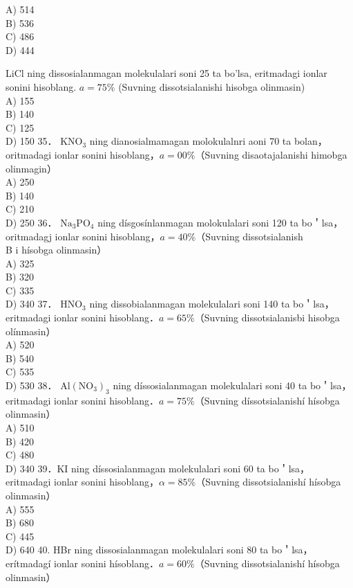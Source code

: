 A) 514\\
B) 536\\
C) 486\\
D) 444
  \item LiCl ning dissosialanmagan molekulalari soni 25 ta bo'lsa, eritmadagi ionlar sonini hisoblang. $a=75 \%$ (Suvning dissotsialanishi hisobga olinmasin)\\
A) 155\\
B) 140\\
C) 125\\
D) 150
35． $\mathrm{KNO}_{3}$ ning dianosialmamagan molokulalnri aoni 70 ta bolan，oritmadagi ionlar sonini hisoblang，$a=00 \%$（Suvning disaotajalanishi himobga olinmagin）\\
A) 250\\
B) 140\\
C) 210\\
D) 250
36． $\mathrm{Na}_{3} \mathrm{PO}_{4}$ ning dísgosínlanmagan molokulalari soni 120 ta bo＇lsa，oritmadagj ionlar sonini hisoblang，$a=40 \%$（Suvning dissotsialanish\\
B i hísobga olinmasin）\\
A) 325\\
B) 320\\
C) 335\\
D) 340
37． $\mathrm{HNO}_{3}$ ning dissobialanmagan molekulalari soni 140 ta bo＇lsa，eritmadagi ionlar sonini hisoblang．$a=65 \%$（Suvning dissotsialanisbi hisobga olínmasin）\\
A) 520\\
B) 540\\
C) 535\\
D) 530
38． $\mathrm{Al}\left(\mathrm{NO}_{3}\right)_{3}$ ning díssosialanmagan molekulalari soni 40 ta bo＇lsa，eritmadagi ionlar sonini hisoblang．$a=75 \%$（Suvning díssotsialanishí hísobga olinmasin）\\
A) 510\\
B) 420\\
C) 480\\
D) 340
39．KI ning díssosialanmagan molekulalari soni 60 ta bo＇lsa，eritmadagi ionlar sonini hisoblang，$\alpha=85 \%$（Suvning dissotsialanishí hísobga olinmasin）\\
A) 555\\
B) 680\\
C) 445\\
D) 640
40. HBr ning dissosialanmagan molekulalari soni 80 ta bo＇lsa，erítmadagí ionlar sonini hísoblang．$a=60 \%$（Suvning dissotsialanishí hísobga olinmasin）\\
